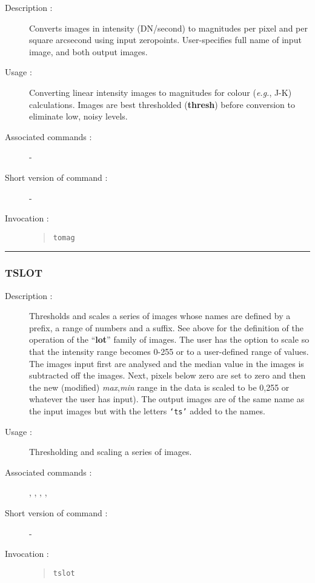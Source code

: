 \begin{description}

\item[Description :] Converts images in intensity (DN/second) to
magnitudes per pixel and per square arcsecond using input zeropoints.
User-specifies full name of input image, and both output images.

\item[Usage :] Converting linear intensity images to
magnitudes for colour (\emph{e.g.}, J-K) calculations.  Images are best
thresholded ({\bf thresh}) before conversion to eliminate low, noisy levels.

\item[Associated commands :] -
\item[Short version of command :] -
\item[Invocation :]

\begin{quote}{\tt  tomag }\end{quote}

\end{description}

\hrule
\subsubsection*{\label{TSLOT}TSLOT}

\begin{description}

\item[Description :] Thresholds and scales a series of images whose
names are defined by a prefix, a range of numbers and a suffix. See
above for the definition of the operation of the ``{\bf lot}'' family
of images.  The user has the option to scale so that the intensity
range becomes 0-255 or to a user-defined range of values.  The images
input first are analysed and the median value in the images is
subtracted off the images. Next, pixels below zero are set to zero and
then the new (modified) {\it max},{\it min} range in the data is scaled
to be 0,255 or whatever the user has input).  The output images are of
the same name as the input images but with the letters {\tt `ts'} added to
the names.

\item[Usage :] Thresholding and scaling a series of images.

\item[Associated commands :] {\tt {}},
{\tt {}}, {\tt {}},
{\tt {}}, {\tt {}}

\item[Short version of command :] -
\item[Invocation :]

\begin{quote}{\tt tslot }\end{quote}

\end{description}

